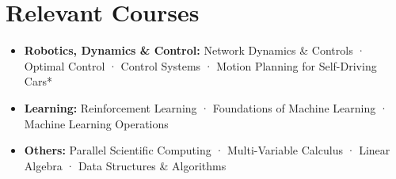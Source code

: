 \documentclass[11pt,a4paper,calibri]{moderncv}        %
\newcommand{\cvreference}[7]{%
    \textbf{#1}\newline%
    \ifthenelse{\equal{#2}{}}{}{\addresssymbol~#2\newline}%
    \ifthenelse{\equal{#3}{}}{}{#3\newline}%
    \ifthenelse{\equal{#4}{}}{}{#4\newline}%
    \ifthenelse{\equal{#5}{}}{}{#5\newline}%
    \ifthenelse{\equal{#6}{}}{}{\emailsymbol~\texttt{#6}\newline}%
    \ifthenelse{\equal{#7}{}}{}{\phonesymbol~#7}}
\newcommand{\cvdoublecolumn}[2]{%
  \cvitem[0.75em]{}{%
    \begin{minipage}[t]{\listdoubleitemcolumnwidth}#1\end{minipage}%
    \hfill%
    \begin{minipage}[t]{\listdoubleitemcolumnwidth}#2\end{minipage}%
    }%
}
\begin{document}
\section{Relevant Courses}

\begin{itemize}[leftmargin=.2in]
\setlength\itemsep{.2em}

\item \textbf{Robotics, Dynamics \& Control:} Network Dynamics \& Controls · Optimal Control · Control Systems · Motion Planning for Self-Driving Cars*
\vspace{-1 pt}
\item \textbf{Learning:} Reinforcement Learning · Foundations of Machine Learning · Machine Learning Operations
\vspace{-1 pt}
\item \textbf{Others:} Parallel Scientific Computing · Multi-Variable Calculus · Linear Algebra · Data Structures \& Algorithms
\vspace{-1.5 pt}

\end{itemize}
\vspace{-15 pt}





\vspace{-18pt}
\end{document}
